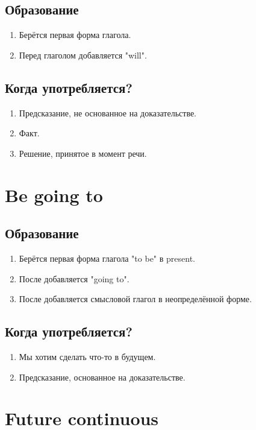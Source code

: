 \documentclass[oneside]{book}
\begin{document}
    \subsection{Образование}
    \begin{enumerate}
        \item Берётся первая форма глагола.
        \item Перед глаголом добавляется "will".
    \end{enumerate}

    \subsection{Когда употребляется?}
    \begin{enumerate}
        \item Предсказание, не основанное на доказательстве.
        \item Факт.
        \item Решение, принятое в момент речи.
    \end{enumerate}

    \section{Be going to}
    \subsection{Образование}
    \begin{enumerate}
        \item Берётся первая форма глагола "to be"{ }в present.
        \item После добавляется "going to".
        \item После добавляется смысловой глагол в неопределённой форме.
    \end{enumerate}

    \subsection{Когда употребляется?}
    \begin{enumerate}
        \item Мы хотим сделать что-то в будущем.
        \item Предсказание, основанное на доказательстве.
    \end{enumerate}

    \section{Future continuous}
\end{document}
